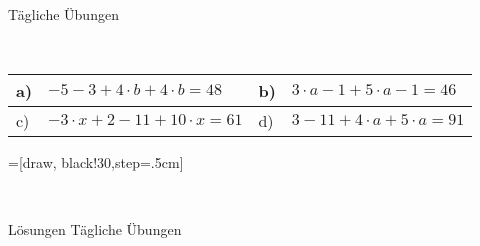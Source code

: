 \documentclass[12pt]{article}
\begin{document}
\centerline{{\Large Tägliche Übungen}} 
\vspace{1cm}
\noindent \\


\begin{xltabular}{\textwidth}{|C{0.75cm}|X|C{0.75cm}|X|}
\hline
a)&$-5-3+4\cdot b+4\cdot b=48$
&
b)&$3\cdot a-1+5\cdot a-1=46$
\\\hline
c)&$-3\cdot x+2-11+10\cdot x=61$
&
d)&$3-11+4\cdot a+5\cdot a=91$
\\\hline
\end{xltabular}
\vspace{0.5cm}
\noindent{}=[draw, black!30,step=.5cm]
\\
\newpage
{}
\centerline{{\large Lösungen Tägliche Übungen}} 
\vspace{0.5cm}
\end{document}
